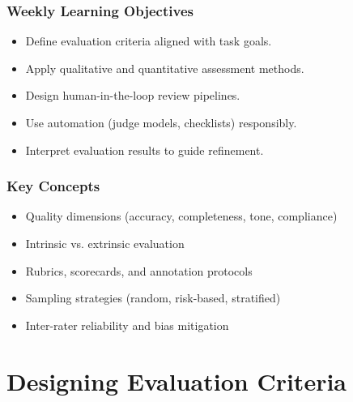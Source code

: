 \documentclass{beamer}
\begin{document}
\begin{frame}
    \frametitle{Weekly Learning Objectives}
    \begin{itemize}
        \item Define evaluation criteria aligned with task goals.
        \item Apply qualitative and quantitative assessment methods.
        \item Design human-in-the-loop review pipelines.
        \item Use automation (judge models, checklists) responsibly.
        \item Interpret evaluation results to guide refinement.
    \end{itemize}
\end{frame}

\begin{frame}
    \frametitle{Key Concepts}
    \begin{itemize}
        \item Quality dimensions (accuracy, completeness, tone, compliance)
        \item Intrinsic vs. extrinsic evaluation
        \item Rubrics, scorecards, and annotation protocols
        \item Sampling strategies (random, risk-based, stratified)
        \item Inter-rater reliability and bias mitigation
    \end{itemize}
\end{frame}

\section{Designing Evaluation Criteria}
\end{document}
